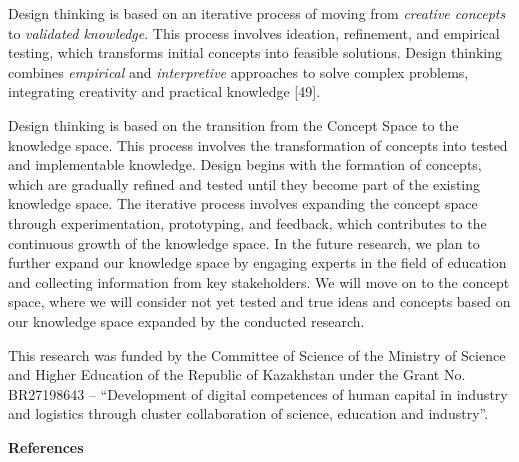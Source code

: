 \begin{multicols}{2}
Design thinking is based on an iterative process of moving from
\emph{creative concepts} to \emph{validated knowledge}. This process
involves ideation, refinement, and empirical testing, which transforms
initial concepts into feasible solutions. Design thinking combines
\emph{empirical} and \emph{interpretive} approaches to solve complex
problems, integrating creativity and practical knowledge {[}49{]}.

Design thinking is based on the transition from the Concept Space to the
knowledge space. This process involves the transformation of concepts
into tested and implementable knowledge. Design begins with the
formation of concepts, which are gradually refined and tested until they
become part of the existing knowledge space. The iterative process
involves expanding the concept space through experimentation,
prototyping, and feedback, which contributes to the continuous growth of
the knowledge space. In the future research, we plan to further expand
our knowledge space by engaging experts in the field of education and
collecting information from key stakeholders. We will move on to the
concept space, where we will consider not yet tested and true ideas and
concepts based on our knowledge space expanded by the conducted
research.

This research was funded by the Committee of Science of the Ministry of
Science and Higher Education of the Republic of Kazakhstan under the
Grant No. BR27198643 -- ``Development of digital competences of human
capital in industry and logistics through cluster collaboration of
science, education and industry''.
\end{multicols}

\begin{center}
{\bfseries References}
\end{center}

